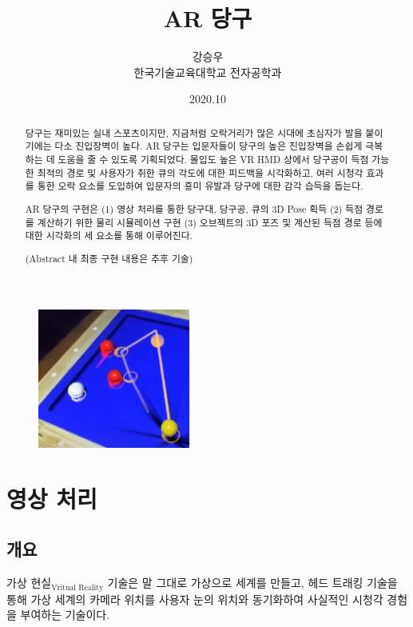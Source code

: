 \documentclass[10pt]{oblivoir}
\title{AR 당구}
\author{강승우 \\ 한국기술교육대학교 전자공학과}
\date{2020.10}
\begin{document}
\maketitle

\begin{figure}[ht]
    \centering
    \includegraphics[width=5cm]{img/abstract-final.png}
\end{figure}

\begin{abstract}
    당구는 재미있는 실내 스포츠이지만, 지금처럼 오락거리가 많은 시대에 초심자가 발을 붙이기에는 다소 진입장벽이 높다. AR 당구는 입문자들이 당구의 높은 진입장벽을 손쉽게 극복하는 데 도움을 줄 수 있도록 기획되었다. 몰입도 높은 VR HMD \footnotemark 상에서 당구공이 득점 가능한 최적의 경로 및 사용자가 취한 큐의 각도에 대한 피드백을 시각화하고, 여러 시청각 효과를 통한 오락 요소를 도입하여 입문자의 흥미 유발과 당구에 대한 감각 습득을 돕는다.

    AR 당구의 구현은 (1) 영상 처리를 통한 당구대, 당구공, 큐의 3D Pose 획득 (2) 득점 경로를 계산하기 위한 물리 시뮬레이션 구현 (3) 오브젝트의 3D 포즈 및 계산된 득점 경로 등에 대한 시각화의 세 요소를 통해 이루어진다.

    (Abstract 내 최종 구현 내용은 추후 기술)
\end{abstract}

\newpage

\twocolumn[]
\section{영상 처리}
\subsection{개요}
가상 현실$_\text{Vritual Reality}$ 기술은 말 그대로 가상으로 세계를 만들고, 헤드 트래킹 기술을 통해 가상 세계의 카메라 위치를 사용자 눈의 위치와 동기화하여 사실적인 시청각 경험을 부여하는 기술이다.
\end{document}
